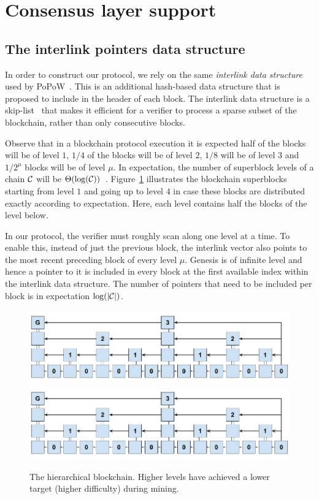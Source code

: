\section{Consensus layer support} \label{sec.consensus}

\subsection{The interlink pointers data structure}
\label{sec.interlink}

In order to construct our protocol, we rely on the same \emph{interlink data
structure} used by PoPoW~\cite{KLS}. This is an additional hash-based data
structure that is proposed to include in the header of each block. The
interlink data structure is a skip-list~\cite{skiplist} that makes it efficient
for a verifier to process a sparse subset of the blockchain, rather than only
consecutive blocks.

Observe that in a blockchain protocol execution it is expected half of the
blocks will be of level $1$, $1/4$ of the blocks will be of level $2$, $1/8$
will be of level $3$ and $1/2^\mu$ blocks will be of level $\mu$. In
expectation, the number of superblock levels of a chain $\mathcal{C}$ will be
$\Theta(\log(\mathcal{C}))$~\cite{KLS}. Figure~\ref{fig.hierarchy} illustrates the
blockchain superblocks starting from level $1$ and going up to level $4$ in case
these blocks are distributed exactly according to expectation. Here, each level
contains half the blocks of the level below.

In our protocol, the verifier must roughly scan along one level at a time. To
enable this, instead of just the previous block, the interlink vector also
points to the most recent preceding block of every level $\mu$. Genesis is of
infinite level and hence a pointer to it is included in every block at the first
available index within the interlink data structure. The number of pointers that
need to be included per block is in expectation $\log(|\mathcal{C}|)$.

\begin{figure}
    \caption{The hierarchical blockchain.
    Higher levels have achieved a lower target (higher difficulty) during mining.}
    \centering
    \iftwocolumn
        \includegraphics[width=\columnwidth,keepaspectratio]{figures/hierarchical-ledger.png}
    \else
        \includegraphics[width=0.7\columnwidth,keepaspectratio]{figures/hierarchical-ledger.png}
    \fi
    \label{fig.hierarchy}
\end{figure}


